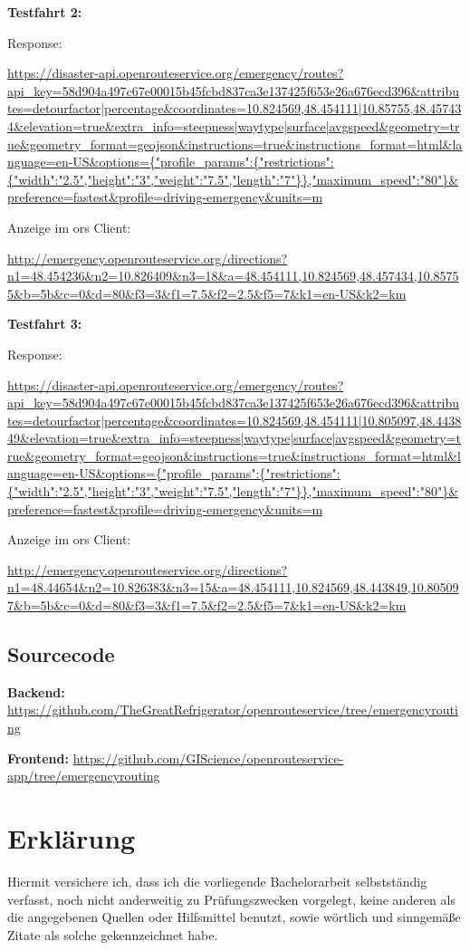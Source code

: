 \textbf{Testfahrt 2:}

Response:\par
\url{https://disaster-api.openrouteservice.org/emergency/routes?api_key=58d904a497c67e00015b45fcbd837ca3e137425f653e26a676ecd396&attributes=detourfactor|percentage&coordinates=10.824569,48.454111|10.85755,48.457434&elevation=true&extra_info=steepness|waytype|surface|avgspeed&geometry=true&geometry_format=geojson&instructions=true&instructions_format=html&language=en-US&options={"profile_params":{"restrictions":{"width":"2.5","height":"3","weight":"7.5","length":"7"}},"maximum_speed":"80"}&preference=fastest&profile=driving-emergency&units=m}
\medskip

Anzeige im \gls{ors} Client:\par
\url{http://emergency.openrouteservice.org/directions?n1=48.454236&n2=10.826409&n3=18&a=48.454111,10.824569,48.457434,10.85755&b=5b&c=0&d=80&f3=3&f1=7.5&f2=2.5&f5=7&k1=en-US&k2=km}
\medskip

\textbf{Testfahrt 3:}

Response:\par
\url{https://disaster-api.openrouteservice.org/emergency/routes?api_key=58d904a497c67e00015b45fcbd837ca3e137425f653e26a676ecd396&attributes=detourfactor|percentage&coordinates=10.824569,48.454111|10.805097,48.443849&elevation=true&extra_info=steepness|waytype|surface|avgspeed&geometry=true&geometry_format=geojson&instructions=true&instructions_format=html&language=en-US&options={"profile_params":{"restrictions":{"width":"2.5","height":"3","weight":"7.5","length":"7"}},"maximum_speed":"80"}&preference=fastest&profile=driving-emergency&units=m}
\medskip

Anzeige im \gls{ors} Client:\par
\url{http://emergency.openrouteservice.org/directions?n1=48.44654&n2=10.826383&n3=15&a=48.454111,10.824569,48.443849,10.805097&b=5b&c=0&d=80&f3=3&f1=7.5&f2=2.5&f5=7&k1=en-US&k2=km}
\medskip

\subsection*{Sourcecode}

\textbf{Backend:}
\url{https://github.com/TheGreatRefrigerator/openrouteservice/tree/emergencyrouting}
\medskip

\textbf{Frontend:}
\url{https://github.com/GIScience/openrouteservice-app/tree/emergencyrouting}

\newpage
\section*{Erklärung}
\vspace{1cm}
Hiermit versichere ich, dass ich die vorliegende Bachelorarbeit selbstständig verfasst, noch nicht anderweitig zu Prüfungszwecken vorgelegt, keine anderen als die angegebenen Quellen oder Hilfsmittel benutzt, sowie wörtlich und sinngemäße Zitate als solche gekennzeichnet habe.\par
\bigskip

